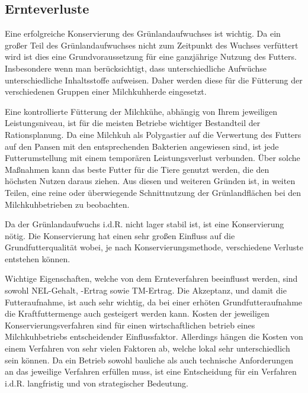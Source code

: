 \subsection{Ernteverluste}
\label{subsec:Lit:Ernte}

Eine erfolgreiche Konservierung des Grünlandaufwuchses ist wichtig.
Da ein großer Teil des Grünlandaufwuchses nicht zum Zeitpunkt des Wuchses verfüttert wird ist dies eine Grundvoraussetzung für eine ganzjährige Nutzung des Futters.
Insbesondere wenn man berücksichtigt, dass unterschiedliche Aufwüchse unterschiedliche Inhaltsstoffe aufweisen.
Daher werden diese für die Fütterung der verschiedenen Gruppen einer Milchkuhherde eingesetzt. 

Eine kontrollierte Fütterung der Milchkühe, abhängig von Ihrem jeweiligen Leistungsniveau, ist für die meisten Betriebe wichtiger Bestandteil der Rationsplanung. 
Da eine Milchkuh als Polygastier auf die Verwertung des Futters auf den Pansen mit den entsprechenden Bakterien angewiesen sind, ist jede Futterumstellung mit einem temporären Leistungsverlust verbunden. 
Über solche Maßnahmen kann das beste Futter für die Tiere genutzt werden, die den höchsten Nutzen daraus ziehen.
Aus diesen und weiteren Gründen ist, in weiten Teilen, eine reine oder überwiegende Schnittnutzung der Grünlandflächen bei den Milchkuhbetrieben zu beobachten.

Da der Grünlandaufwuchs i.d.R. nicht lager stabil ist, ist eine Konservierung nötig.
Die Konservierung hat einen sehr großen Einfluss auf die Grundfutterqualität wobei, je nach Konservierungsmethode, verschiedene Verluste entstehen können. 

Wichtige Eigenschaften, welche von dem Ernteverfahren beeinflusst werden, sind sowohl \ac{NEL}-Gehalt, -Ertrag sowie \ac{TM}-Ertrag.
Die Akzeptanz, und damit die Futteraufnahme, ist auch sehr wichtig, da bei einer erhöten Grundfutteraufnahme die Kraftfuttermenge auch gesteigert werden kann.
Kosten der jeweiligen Konservierungsverfahren sind für einen wirtschaftlichen betrieb eines Milchkuhbetriebs entscheidender Einflussfaktor. 
Allerdings hängen die Kosten von einem Verfahren von sehr vielen Faktoren ab, welche lokal sehr unterschiedlich sein können.
Da ein Betrieb sowohl bauliche als auch technische Anforderungen an das jeweilige Verfahren erfüllen muss, ist eine Entscheidung für ein Verfahren i.d.R. langfristig und von strategischer Bedeutung. 

